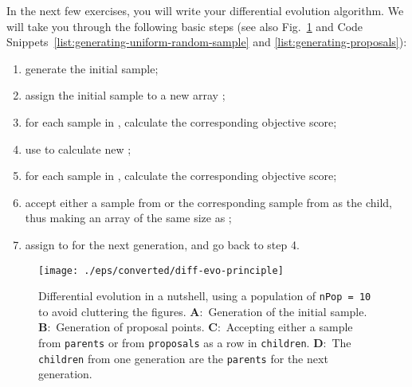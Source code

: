 In the next few exercises, you will write your differential evolution algorithm.
We will take you through the following basic steps (see also
\textsf{Fig.~\ref{fig:diff-evo-principle}} and \textsf{Code
Snippets~\ref{list:generating-uniform-random-sample}} and
\textsf{\ref{list:generating-proposals}}):
\begin{enumerate}
\item{generate the initial sample;}
\item{assign the initial sample to a new array ;}
\item{for each sample in , calculate the corresponding objective
score;}
\item{use  to calculate new ;}
\item{for each sample in , calculate the corresponding objective
score;}
\item{accept either a sample from  or the corresponding sample
from  as the child, thus making an array  of the
same size as ;}
\item{assign  to  for the next generation, and go
back to step 4.}
\end{enumerate}

\begin{figure}[htbp]
  \centering
    \texttt{[image: ./eps/converted/diff-evo-principle]}
  \caption{Differential evolution in a nutshell, using a population of
  \texttt{nPop = 10} to avoid cluttering the figures. \textbf{A}:~Generation of
  the initial sample. \textbf{B}:~Generation of proposal points.
  \textbf{C}:~Accepting either a sample from \texttt{parents} or from 
  \texttt{proposals} as a row in \texttt{children}. \textbf{D}:~The 
  \texttt{children} from one generation are the \texttt{parents} for the
  next generation.}
  \label{fig:diff-evo-principle}
\end{figure}






